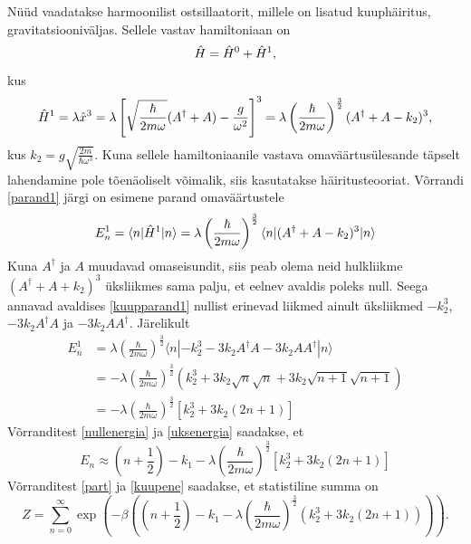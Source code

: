 \documentclass{trkut}%
\renewcommand\braket[1]{\langle{#1}\rangle}
\begin{document}
Nüüd vaadatakse harmoonilist ostsillaatorit, millele on lisatud kuuphäiritus, gravitatsiooniväljas. Sellele vastav hamiltoniaan on
\begin{equation}
    \op{H}=\op[0]{H}+\op[1]{H},
\end{equation}
kus
\begin{equation}
    \op[1]{H}=\lambda \op{x}^3 = \lambda \left[ \sqrt{\frac{\hbar}{2m\omega}}(A^\dagger + A) - \frac{g}{\omega^2}\right]^3=\lambda \left(\frac{\hbar}{2m\omega}\right)^\frac{3}{2} (A^\dagger + A - k_2)^3,
\end{equation}
kus $k_2=g\sqrt{\frac{2m}{\hbar \omega^3}}$.
Kuna sellele hamiltoniaanile vastava omaväärtusülesande täpselt lahendamine pole tõenäoliselt võimalik, siis kasutatakse häiritusteooriat. Võrrandi \eqref{parand1} järgi on esimene parand omaväärtustele
\begin{equation}
    E_n^1=\braket{n|\op[1]{H}|n}=\lambda \left(\frac{\hbar}{2m\omega}\right)^\frac{3}{2} \braket{n|(A^\dagger + A - k_2)^3|n}
    \label{kuupparand1}
\end{equation}
Kuna $A^\dagger$ ja $A$ muudavad omaseisundit, siis peab olema neid hulkliikme $(A^\dagger + A + k_2)^3$ üksliikmes sama palju, et eelnev avaldis poleks null. Seega annavad avaldises \eqref{kuupparand1} nullist erinevad liikmed ainult üksliikmed $-k_2^3$, $-3k_2A^\dagger A$ ja $-3k_2AA^\dagger$. Järelikult
\begin{align}
    E_n^1&=\lambda \left(\frac{\hbar}{2m\omega}\right)^\frac{3}{2} \braket{n|-k_2^3-3k_2A^\dagger A- 3k_2 A A^\dagger|n} \nonumber \\
    &= -\lambda \left(\frac{\hbar}{2m\omega}\right)^\frac{3}{2} (k_2^3 + 3k_2\sqrt{n}\sqrt{n} + 3k_2\sqrt{n+1}\sqrt{n+1}) \nonumber \\
    &= -\lambda \left(\frac{\hbar}{2m\omega}\right)^\frac{3}{2} [k_2^3 + 3k_2(2n+1)] \label{uksenergia}
\end{align}
Võrranditest \eqref{nullenergia} ja \eqref{uksenergia} saadakse, et
\begin{equation}
    E_n \approx \left(n+\frac{1}{2}\right) - k_1 - \lambda \left(\frac{\hbar}{2m\omega}\right)^\frac{3}{2} [k_2^3 + 3k_2(2n+1)]
    \label{kuupene}
\end{equation}
Võrranditest \eqref{part} ja \eqref{kuupene} saadakse, et statistiline summa on
\begin{equation}
    Z=\sum_{n=0}^{\infty} \exp\left(-\beta \left(\left(n+\frac{1}{2}\right) - k_1 - \lambda \left(\frac{\hbar}{2m\omega}\right)^\frac{3}{2} (k_2^3 + 3k_2(2n+1)) \right)\right).
\end{equation}
\end{document}
